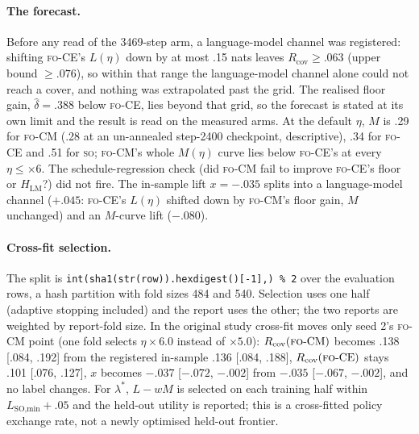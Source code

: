 \documentclass[11pt]{article}
\newcommand{\FO}{\textsc{fo}}
\newcommand{\SO}{\textsc{so}}
\newcommand{\lam}{\ensuremath{\lambda^{\ast}}}
\newcommand{\Rcov}{\ensuremath{R_{\mathrm{cov}}}}
\begin{document}
\paragraph{The forecast.} Before any read of the 3469-step arm, a language-model channel was
registered: shifting \FO-CE's $L(\eta)$ down by at most .15 nats leaves $\Rcov\ge.063$ (upper bound
$\ge.076$), so within that range the language-model channel alone could not reach a cover, and
nothing was extrapolated past the grid. The realised floor gain, $\hat\delta=.388$ below \FO-CE, lies beyond that
grid, so the forecast is stated at its own limit and the result is read on the measured arms. At the
default $\eta$, $M$ is .29 for \FO-CM{} (.28 at an un-annealed step-2400 checkpoint, descriptive), .34
for \FO-CE{} and .51 for \SO; \FO-CM's whole $M(\eta)$ curve lies below \FO-CE's at every
$\eta\le\times6$. The schedule-regression check (did \FO-CM{} fail to improve \FO-CE's floor or
$H_{\text{LM}}$?) did not fire. The in-sample lift $x=-.035$ splits into a language-model channel
($+.045$: \FO-CE's $L(\eta)$ shifted down by \FO-CM's floor gain, $M$ unchanged) and an $M$-curve lift
($-.080$).

\paragraph{Cross-fit selection.} The split is
\texttt{int(sha1(str(row))\allowbreak.hexdigest()[-1],) \% 2} over the evaluation rows, a hash partition with
fold sizes 484 and 540. Selection uses one half (adaptive stopping included) and the report uses the
other; the two reports are weighted by report-fold size. In the original study cross-fit moves only
seed 2's \FO-CM{} point (one fold selects $\eta\times6.0$ instead of $\times5.0$):
$\Rcov(\FO\text{-CM})$ becomes .138 [.084, .192] from the registered in-sample .136 [.084, .188],
$\Rcov(\FO\text{-CE})$ stays .101 [.076, .127], $x$ becomes $-.037$ [$-.072$, $-.002$] from $-.035$
[$-.067$, $-.002$], and no label changes. For $\lam$, $L-wM$ is selected on each training half within
$L_{\text{SO,min}}+.05$ and the held-out utility is reported; this is a cross-fitted policy exchange
rate, not a newly optimised held-out frontier.
\end{document}
